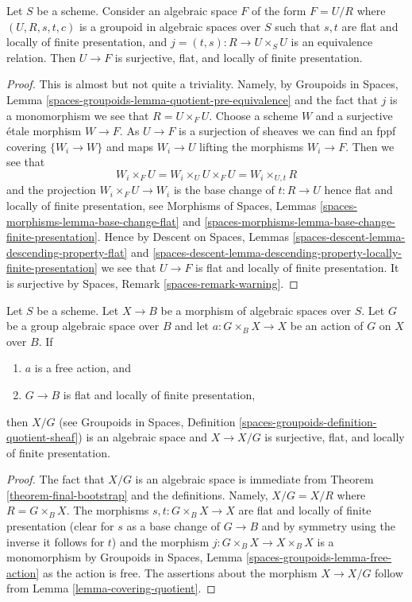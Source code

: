 \begin{lemma}
\label{lemma-covering-quotient}
Let $S$ be a scheme. Consider an algebraic space $F$ of the form $F = U/R$
where $(U, R, s, t, c)$ is a groupoid in algebraic spaces
over $S$ such that $s, t$ are flat and locally of finite presentation, and
$j = (t, s) : R \to U \times_S U$ is an equivalence relation.
Then $U \to F$ is surjective, flat, and locally of finite presentation.
\end{lemma}

\begin{proof}
This is almost but not quite a triviality. Namely, by
Groupoids in Spaces, Lemma
\ref{spaces-groupoids-lemma-quotient-pre-equivalence}
and the fact that $j$ is a monomorphism we see that $R = U \times_F U$.
Choose a scheme $W$ and a surjective \'etale morphism $W \to F$.
As $U \to F$ is a surjection of sheaves we can find an fppf covering
$\{W_i \to W\}$ and maps $W_i \to U$ lifting the morphisms $W_i \to F$.
Then we see that
$$
W_i \times_F U = W_i \times_U U \times_F U = W_i \times_{U, t} R
$$
and the projection $W_i \times_F U \to W_i$ is the base change of
$t : R \to U$ hence flat and locally of finite presentation, see
Morphisms of Spaces, Lemmas
\ref{spaces-morphisms-lemma-base-change-flat} and
\ref{spaces-morphisms-lemma-base-change-finite-presentation}.
Hence by
Descent on Spaces, Lemmas
\ref{spaces-descent-lemma-descending-property-flat} and
\ref{spaces-descent-lemma-descending-property-locally-finite-presentation}
we see that $U \to F$ is flat and locally of finite presentation.
It is surjective by
Spaces, Remark \ref{spaces-remark-warning}.
\end{proof}

\begin{lemma}
\label{lemma-quotient-free-action}
Let $S$ be a scheme. Let $X \to B$ be a morphism of algebraic spaces over
$S$. Let $G$ be a group algebraic space over $B$ and let
$a : G \times_B X \to X$ be an action of $G$ on $X$ over $B$.
If
\begin{enumerate}
\item $a$ is a free action, and
\item $G \to B$ is flat and locally of finite presentation,
\end{enumerate}
then $X/G$ (see
Groupoids in Spaces, Definition
\ref{spaces-groupoids-definition-quotient-sheaf})
is an algebraic space and $X \to X/G$ is surjective, flat, and locally
of finite presentation.
\end{lemma}

\begin{proof}
The fact that $X/G$ is an algebraic space is immediate from
Theorem \ref{theorem-final-bootstrap}
and the definitions. Namely, $X/G = X/R$ where $R = G \times_B X$.
The morphisms $s, t : G \times_B X \to X$ are flat and locally of
finite presentation (clear for $s$ as a base change of $G \to B$ and
by symmetry using the inverse it follows for $t$) and the morphism
$j : G \times_B X \to X \times_B X$ is a monomorphism by
Groupoids in Spaces, Lemma \ref{spaces-groupoids-lemma-free-action}
as the action is free. The assertions about the morphism $X \to X/G$
follow from
Lemma \ref{lemma-covering-quotient}.
\end{proof}

